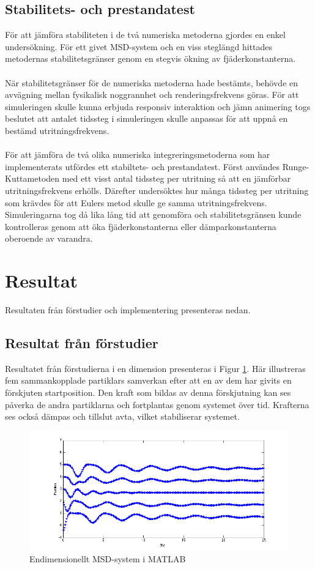 \documentclass[a4paper,12pt,oneside,final,swedish]{extarticle}
\begin{document}
\subsection{Stabilitets- och prestandatest}
För att jämföra stabiliteten i de två numeriska metoderna gjordes en enkel undersökning. För ett givet MSD-system och en viss steglängd hittades metodernas stabilitetsgränser genom en stegvis ökning av fjäderkonstanterna.
\\\\När stabilitetsgränser för de numeriska metoderna hade bestämts, behövde en avvägning mellan fysikalisk noggrannhet och renderingsfrekvens göras. För att simuleringen skulle kunna erbjuda responsiv interaktion och jämn animering togs beslutet att antalet tidssteg i simuleringen skulle anpassas för att uppnå en bestämd utritningsfrekvens.
\\\\För att jämföra de två olika numeriska integreringsmetoderna som har implementerats utfördes ett stabiltets- och prestandatest. Först användes Runge-Kuttametoden med ett visst antal tidssteg per utritning så att en jämförbar utritningsfrekvens erhölls. Därefter undersöktes hur många tidssteg per utritning som krävdes för att Eulers metod skulle ge samma utritningsfrekvens. Simuleringarna tog då lika lång tid att genomföra och stabilitetsgränsen kunde kontrolleras genom att öka fjäderkonstanterna eller dämparkonstanterna oberoende av varandra.
\section{Resultat}
Resultaten från förstudier och implementering presenteras nedan.
\subsection{Resultat från förstudier}
Resultatet från förstudierna i en dimension presenteras i Figur \ref{endim::nonfloat}. Här illustreras fem sammankopplade partiklars samverkan efter att en av dem har givits en förskjuten startposition. Den kraft som bildas av denna förskjutning kan ses påverka de andra partiklarna och fortplantas genom systemet över tid. Krafterna ses också dämpas och tillslut avta, vilket stabiliserar systemet.

\begin{figure}[h!]
  \begin{center}
    \includegraphics[width=16cm]{Bilder/1D_matlab.png} 
  \end{center}
  \caption{Endimensionellt MSD-system i MATLAB}
  \label{endim::nonfloat}
\end{figure}
\end{document}
